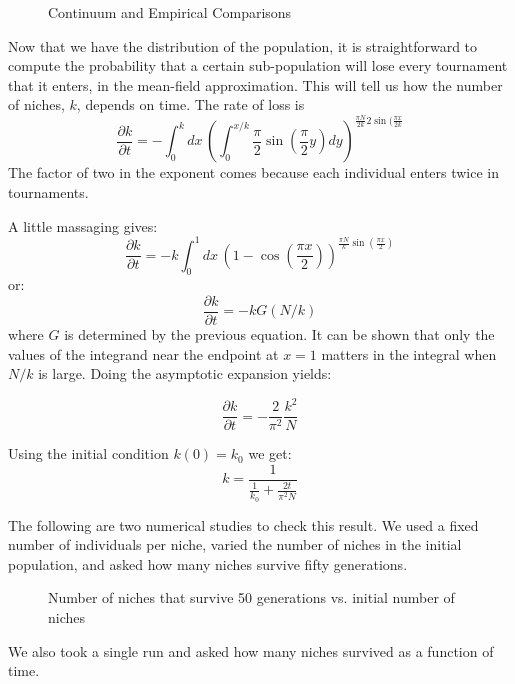 \begin{figure}
\caption{Continuum and Empirical Comparisons}
\end{figure}

Now that we have the distribution of the population, it is straightforward
to compute the probability that a certain sub-population will lose every
tournament that it enters, in the mean-field approximation.  This will
tell us how the number of niches, $k$, depends on time.
The rate of loss is
\begin{equation}
\frac{\partial k}{\partial t}= -
\int_0^k{dx\,(\int_0^{x/k}\frac{\pi}{2}\sin(\frac{\pi}{2}y)dy)^{
	\frac{\pi N}{2 k} 2 \sin(\frac{\pi x}{2 k}}}
\end{equation}
The factor of two in the exponent comes because each individual enters
twice in tournaments.

A little massaging gives:
\begin{equation}
\frac{\partial k}{\partial t}= -
k \int_0^1{dx\,(1-\cos(\frac{\pi x}{2}))^{\frac{\pi N}{k} \sin(\frac{\pi x}{2})}}
\end{equation}
or:
\begin{equation}
\frac{\partial k}{\partial t}=-k G(N/k)
\end{equation}
where $G$ is determined by the previous equation.
It can be shown that only the values of the integrand near the endpoint at $x=1$
matters in the integral when $N/k$ is large.  Doing the asymptotic
expansion yields:

\begin{equation}
\frac{\partial k}{\partial t}=-\frac{2}{\pi^2}\frac{k^2}{N}
\end{equation}

Using the initial condition $k(0)=k_0$ we get:
\begin{equation}
k=\frac{1}{\frac{1}{k_0}+\frac{2t}{\pi^2 N}}
\end{equation}

The following are two numerical studies to check this result.  We used
a fixed number of individuals per niche, varied the number of niches in
the initial population, and asked how many niches survive fifty generations.
\begin{figure}
\caption{Number of niches that survive 50 generations vs. initial number of niches}
\end{figure}
We also took a single run and asked how many niches survived as a function
of time.
\begin{figure}
\end{figure}


